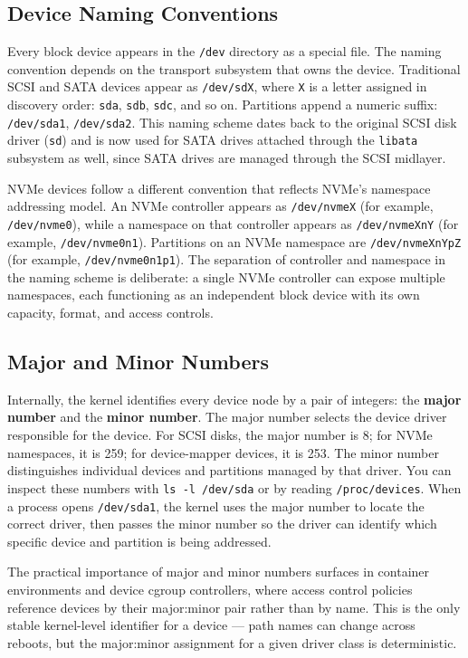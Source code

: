 \subsection{Device Naming Conventions}

Every block device appears in the \texttt{/dev} directory as a special file. The naming convention depends on the transport subsystem that owns the device. Traditional SCSI and SATA devices appear as \texttt{/dev/sdX}, where \texttt{X} is a letter assigned in discovery order: \texttt{sda}, \texttt{sdb}, \texttt{sdc}, and so on. Partitions append a numeric suffix: \texttt{/dev/sda1}, \texttt{/dev/sda2}. This naming scheme dates back to the original SCSI disk driver (\texttt{sd}) and is now used for SATA drives attached through the \texttt{libata} subsystem as well, since SATA drives are managed through the SCSI midlayer.

NVMe devices follow a different convention that reflects NVMe's namespace addressing model. An NVMe controller appears as \texttt{/dev/nvmeX} (for example, \texttt{/dev/nvme0}), while a namespace on that controller appears as \texttt{/dev/nvmeXnY} (for example, \texttt{/dev/nvme0n1}). Partitions on an NVMe namespace are \texttt{/dev/nvmeXnYpZ} (for example, \texttt{/dev/nvme0n1p1}). The separation of controller and namespace in the naming scheme is deliberate: a single NVMe controller can expose multiple namespaces, each functioning as an independent block device with its own capacity, format, and access controls.

\subsection{Major and Minor Numbers}

Internally, the kernel identifies every device node by a pair of integers: the \textbf{major number} and the \textbf{minor number}. The major number selects the device driver responsible for the device. For SCSI disks, the major number is 8; for NVMe namespaces, it is 259; for device-mapper devices, it is 253. The minor number distinguishes individual devices and partitions managed by that driver. You can inspect these numbers with \texttt{ls -l /dev/sda} or by reading \texttt{/proc/devices}. When a process opens \texttt{/dev/sda1}, the kernel uses the major number to locate the correct driver, then passes the minor number so the driver can identify which specific device and partition is being addressed.

The practical importance of major and minor numbers surfaces in container environments and device cgroup controllers, where access control policies reference devices by their major:minor pair rather than by name. This is the only stable kernel-level identifier for a device --- path names can change across reboots, but the major:minor assignment for a given driver class is deterministic.

